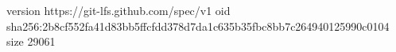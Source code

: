 version https://git-lfs.github.com/spec/v1
oid sha256:2b8cf552fa41d83bb5ffcfdd378d7da1c635b35fbc8bb7c264940125990c0104
size 29061
